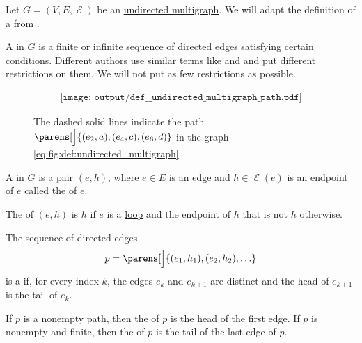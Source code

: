 \begin{definition}\label{def:undirected_multigraph_path}
  Let \( G = (V, E, \mscrE) \) be an \hyperref[def:undirected_multigraph]{undirected multigraph}. We will adapt the definition of a  from .

  A  in \( G \) is a finite or infinite sequence of directed edges satisfying certain conditions. Different authors use similar terms like  and  and put different restrictions on them. We will not put as few restrictions as possible.

  \begin{figure}
    \begin{equation}\label{eq:fig:def:undirected_multigraph_path}
      \begin{aligned}
        \texttt{[image: output/def\_\_undirected\_multigraph\_path.pdf]}
      \end{aligned}
    \end{equation}
    \caption{The dashed solid lines indicate the path \( \parens[\Big]{ (e_2, a), (e_4, c), (e_6, d) } \) in the graph \eqref{eq:fig:def:undirected_multigraph}.}\label{fig:def:undirected_multigraph_path}
  \end{figure}

  \begin{thmenum}
     A  in \( G \) is a pair \( (e, h) \), where \( e \in E \) is an edge and \( h \in \mscrE(e) \) is an endpoint of \( e \) called the  of \( e \).

    The  of \( (e, h) \) is \( h \) if \( e \) is a \hyperref[def:hypergraph/cardinality]{loop} and the endpoint of \( h \) that is not \( h \) otherwise.

     The sequence of directed edges
    \begin{equation}\label{eq:def:undirected_multigraph_path/path}
      p = \parens[\Big]{ (e_1, h_1), (e_2, h_2), \ldots }
    \end{equation}
    is a  if, for every index \( k \), the edges \( e_k \) and \( e_{k+1} \) are distinct and the head of \( e_{k+1} \) is the tail of \( e_k \).

     If \( p \) is a nonempty path, then the  of \( p \) is the head of the first edge. If \( p \) is nonempty and finite, then the  of \( p \) is the tail of the last edge of \( p \).


\end{thmenum}
\end{definition}
